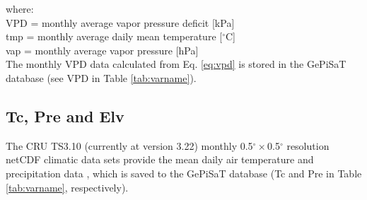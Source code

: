 \noindent where:\\
\indent VPD = monthly average vapor pressure deficit [kPa]\\
\indent tmp = monthly average daily mean temperature [$^{\circ}$C]\\
\indent vap = monthly average vapor pressure [hPa]\\

The monthly VPD data calculated from Eq. \ref{eq:vpd} is stored in the GePiSaT database (see VPD in Table \ref{tab:varname}).

\subsection{Tc, Pre and Elv}
\label{sec:gepcru}
The CRU TS3.10 (currently at version 3.22) monthly 0.5$^{\circ}\times$0.5$^{\circ}$ resolution netCDF climatic data sets provide the mean daily air temperature and precipitation data \parencite{harris14}, which is saved to the GePiSaT database (Tc and Pre in Table \ref{tab:varname}, respectively).


